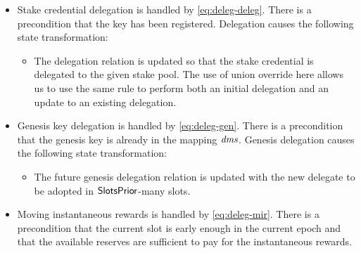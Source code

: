 \begin{itemize}
  \item Stake credential delegation is handled by \cref{eq:deleg-deleg}.
    There is a precondition that the key has been registered.
    Delegation causes the following state transformation:
    \begin{itemize}
    \item The delegation relation is updated so that the stake credential is
      delegated to the given stake pool. The use of union override here allows
      us to use the same rule to perform both an initial delegation and an
      update to an existing delegation.
    \end{itemize}

  \item Genesis key delegation is handled by \cref{eq:deleg-gen}.
    There is a precondition that the genesis key is already in the mapping $\mathit{dms}$.
    Genesis delegation causes the following state transformation:
    \begin{itemize}
      \item The future genesis delegation relation is updated with the new delegate
        to be adopted in $\mathsf{SlotsPrior}$-many slots.
      \end{itemize}

    \item  Moving instantaneous rewards is handled by \cref{eq:deleg-mir}. There
      is a precondition that the current slot is early enough in the current
      epoch and that the available reserves are sufficient to pay for the
      instantaneous rewards.
\end{itemize}



